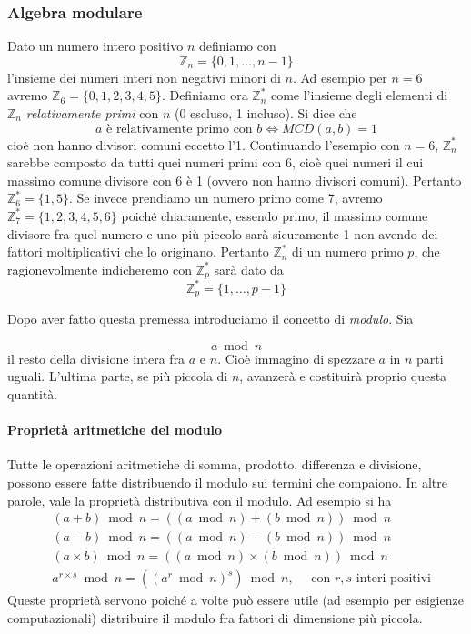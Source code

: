 \documentclass{article}
\theoremstyle{definition}
\begin{document}
\subsubsection{Algebra modulare}
Dato un numero intero positivo $n$ definiamo con 
\begin{equation*}
    \mathbb{Z}_n = \{0,1,\dots ,n-1\}
\end{equation*}
l'insieme dei numeri interi non negativi minori di $n$. 
Ad esempio per $n = 6$ avremo $\mathbb{Z}_6 = \{0,1,2,3,4,5\}$.
Definiamo ora $\mathbb{Z}_n^*$ come l'insieme degli elementi di $\mathbb{Z}_n$ \emph{relativamente primi} con $n$ (0 escluso, 1 incluso). Si dice che
\begin{equation*}
    a \text{ è relativamente primo con } b \Leftrightarrow MCD(a, b) = 1
\end{equation*}
cioè non hanno divisori comuni eccetto l'1.
Continuando l'esempio con $n = 6$, $\mathbb{Z}_n^*$ sarebbe composto da tutti quei numeri primi con 6, cioè quei numeri il cui massimo comune divisore con 6 è 1 (ovvero non hanno divisori comuni). Pertanto
$\mathbb{Z}_6^* = \{1,5\}$.
Se invece prendiamo un numero primo come 7, avremo $\mathbb{Z}_7^* = \{1,2,3,4,5,6\}$ poiché chiaramente, essendo primo, il massimo comune divisore fra quel numero e uno più piccolo sarà sicuramente 1 non avendo dei fattori moltiplicativi che lo originano. 
Pertanto $\mathbb{Z}_n^*$ di un numero primo $p$, che ragionevolmente indicheremo con $\mathbb{Z}_p^*$ sarà dato da
\begin{equation*}
    \mathbb{Z}_p^* = \{1, \dots, p-1\}
\end{equation*}

Dopo aver fatto questa premessa introduciamo il concetto di \emph{modulo}. Sia

\begin{equation*}
    a \bmod n
\end{equation*}
il resto della divisione intera fra $a$ e $n$. Cioè immagino di spezzare $a$ in $n$ parti uguali. L'ultima parte, se più piccola di $n$, avanzerà e costituirà proprio questa quantità.

\paragraph{Proprietà aritmetiche del modulo}
Tutte le operazioni aritmetiche di somma, prodotto, differenza e divisione, possono essere fatte distribuendo il modulo sui termini che compaiono. In altre parole, vale la proprietà distributiva con il modulo.
Ad esempio si ha
\begin{align*}
    &(a + b) \bmod n = ((a \bmod n) + (b \bmod n)) \bmod n \\ 
    &(a - b) \bmod n = ((a \bmod n) - (b \bmod n)) \bmod n \\
    &(a \times b) \bmod n = ((a \bmod n) \times (b \bmod n)) \bmod n \\
    &a^{r \times s} \bmod n = ((a^r \bmod n)^s) \bmod n, \quad \text{ con } r,s \text{ interi positivi} 
\end{align*}
Queste proprietà servono poiché a volte può essere utile (ad esempio per esigienze computazionali) distribuire il modulo fra fattori di dimensione più piccola.
\end{document}
